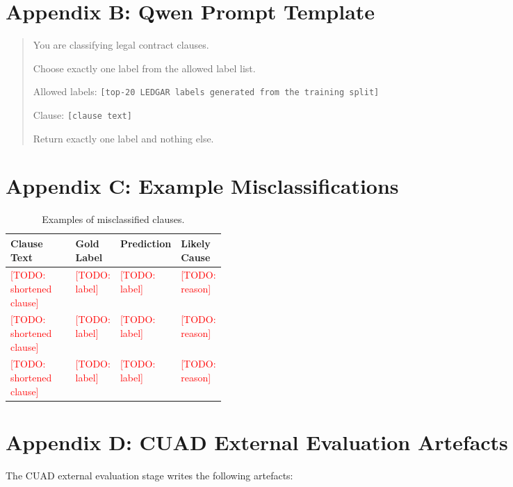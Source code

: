 \documentclass[11pt]{article}
\newcommand{\todo}[1]{\textcolor{red}{[TODO: #1]}}
\begin{document}
\section{Appendix B: Qwen Prompt Template}

\begin{quote}
You are classifying legal contract clauses.

Choose exactly one label from the allowed label list.

Allowed labels:
\texttt{[top-20 LEDGAR labels generated from the training split]}

Clause:
\texttt{[clause text]}

Return exactly one label and nothing else.
\end{quote}

\section{Appendix C: Example Misclassifications}

\begin{table}[h]
\centering
\small
\begin{tabular}{p{0.36\linewidth}lll}
\toprule
\textbf{Clause Text} & \textbf{Gold Label} & \textbf{Prediction} & \textbf{Likely Cause} \\
\midrule
\todo{shortened clause} & \todo{label} & \todo{label} & \todo{reason} \\
\todo{shortened clause} & \todo{label} & \todo{label} & \todo{reason} \\
\todo{shortened clause} & \todo{label} & \todo{label} & \todo{reason} \\
\bottomrule
\end{tabular}
\caption{Examples of misclassified clauses.}
\label{tab:appendix-misclassifications}
\end{table}

\section{Appendix D: CUAD External Evaluation Artefacts}

The CUAD external evaluation stage writes the following artefacts:
\end{document}
